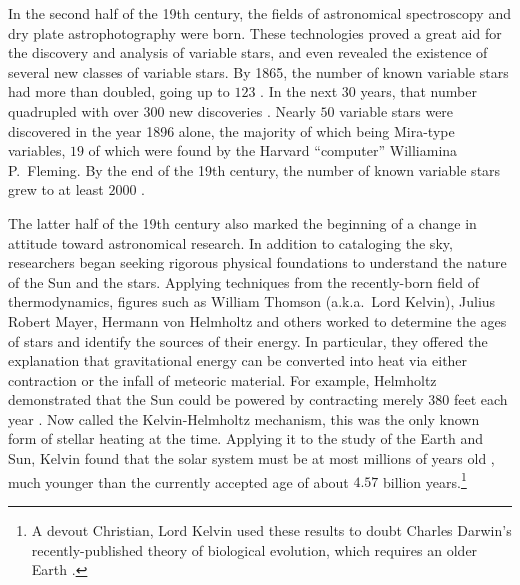 In the second half of the 19th century, the fields of astronomical spectroscopy and dry plate astrophotography were born. 
These technologies proved a great aid for the discovery and analysis of variable stars, and even revealed the existence of several new classes of variable stars. 
By 1865, the number of known variable stars had more than doubled, going up to $123$ \citep{1865AN.....63..117C}. %
In the next $30$ years, that number quadrupled with over $300$ new discoveries \citep[e.g.,][]{1997JAVSO..25..115H}. 
Nearly $50$ variable stars were discovered in the year 1896 alone, the majority of which being Mira-type variables, $19$ of which were found by the Harvard ``computer'' Williamina P.~Fleming. 
By the end of the 19th century, the number of known variable stars grew to at least $2000$ \citep[e.g.,][]{Samus2017}. %



The latter half of the 19th century also marked the beginning of a change in attitude toward astronomical research. 
In addition to cataloging the sky, researchers began seeking rigorous physical foundations to understand the nature of the Sun and the stars. 
Applying techniques from the recently-born field of thermodynamics, figures such as William Thomson (a.k.a.\ Lord Kelvin), Julius Robert Mayer, Hermann von Helmholtz and others worked to determine the ages of stars and identify the sources of their energy. %
In particular, they offered the explanation that gravitational energy can be converted into heat via either contraction or the infall of meteoric material. 
For example, Helmholtz demonstrated that the Sun could be powered by contracting merely $380$ feet each year \citep[e.g.,][]{ARNY1990211}. 
Now called the Kelvin-Helmholtz mechanism, this was the only known form of stellar heating at the time. 
Applying it to the study of the Earth and Sun, Kelvin found that the solar system must be at most millions of years old \citep[e.g.,][]{1895Natur..51..438K}, much younger than the currently accepted age of about $4.57$ billion years.\footnote{ A devout Christian, Lord Kelvin used these results to doubt Charles Darwin's recently-published theory of biological evolution, which requires an older Earth \citep{darwin}.}

